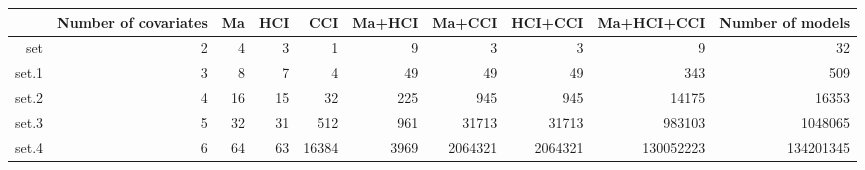 \begin{table}[ht]
\centering
\begin{tabular}{rrrrrrrrrr}
  \hline
 & Number of covariates & Ma & HCI & CCI & Ma+HCI & Ma+CCI & HCI+CCI & Ma+HCI+CCI & Number of models \\ 
  \hline
set & 2 & 4 & 3 & 1 & 9 & 3 & 3 & 9 & 32 \\ 
  set.1 & 3 & 8 & 7 & 4 & 49 & 49 & 49 & 343 & 509 \\ 
  set.2 & 4 & 16 & 15 & 32 & 225 & 945 & 945 & 14175 & 16353 \\ 
  set.3 & 5 & 32 & 31 & 512 & 961 & 31713 & 31713 & 983103 & 1048065 \\ 
  set.4 & 6 & 64 & 63 & 16384 & 3969 & 2064321 & 2064321 & 130052223 & 134201345 \\ 
   \hline
\end{tabular}
\end{table}
